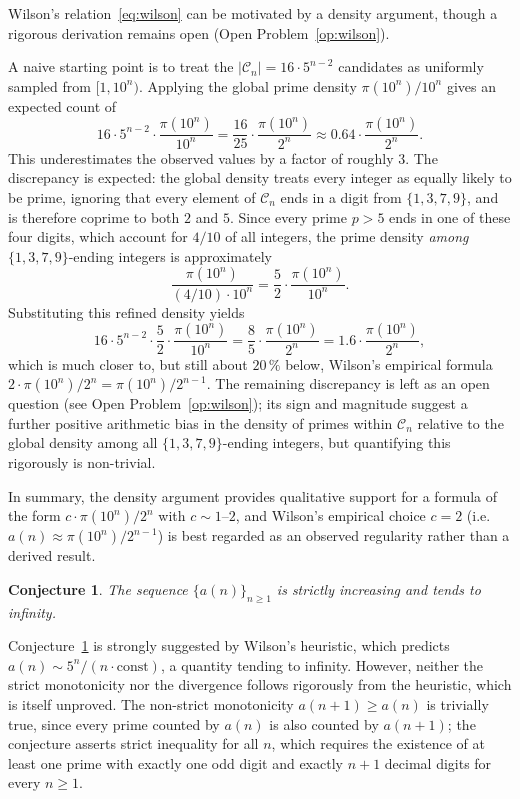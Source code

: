 \documentclass[11pt,a4paper]{article}
\newtheorem{conjecture}[theorem]{Conjecture}
\theoremstyle{definition}
\begin{document}
Wilson's relation~\eqref{eq:wilson} can be motivated by a density
argument, though a rigorous derivation remains open
(Open Problem~\ref{op:wilson}).

A naive starting point is to treat the $|\mathcal{C}_n| = 16 \cdot 5^{n-2}$
candidates as uniformly sampled from $[1, 10^n)$.  Applying the global
prime density $\pi(10^n)/10^n$ gives an expected count of
\[
  16 \cdot 5^{n-2} \cdot \frac{\pi(10^n)}{10^n}
   = \frac{16}{25} \cdot \frac{\pi(10^n)}{2^n}
   \approx 0.64 \cdot \frac{\pi(10^n)}{2^n}.
\]
This underestimates the observed values by a factor of roughly $3$.  The
discrepancy is expected: the global density treats every integer as equally
likely to be prime, ignoring that every element of $\mathcal{C}_n$
ends in a digit from $\{1,3,7,9\}$, and is therefore coprime to both $2$
and $5$.  Since every prime $p > 5$ ends in one of these four digits,
which account for $4/10$ of all integers, the prime density
\emph{among} $\{1,3,7,9\}$-ending integers is approximately
\[
  \frac{\pi(10^n)}{(4/10) \cdot 10^n}
  = \frac{5}{2} \cdot \frac{\pi(10^n)}{10^n}.
\]
Substituting this refined density yields
\[
  16 \cdot 5^{n-2} \cdot \frac{5}{2} \cdot \frac{\pi(10^n)}{10^n}
   = \frac{8}{5} \cdot \frac{\pi(10^n)}{2^n}
   = 1.6 \cdot \frac{\pi(10^n)}{2^n},
\]
which is much closer to, but still about $20\,\%$ below, Wilson's empirical
formula $2 \cdot \pi(10^n)/2^n = \pi(10^n)/2^{n-1}$. The remaining
discrepancy is left as an open question (see Open Problem~\ref{op:wilson});
its sign and magnitude suggest a further positive arithmetic bias in the
density of primes within $\mathcal{C}_n$ relative to the global density
among all $\{1,3,7,9\}$-ending integers, but quantifying this rigorously
is non-trivial.

In summary, the density argument provides qualitative support for a formula
of the form $c \cdot \pi(10^n)/2^n$ with $c \sim 1$--$2$, and Wilson's
empirical choice $c=2$ (i.e.\ $a(n) \approx \pi(10^n)/2^{n-1}$) is best
regarded as an observed regularity rather than a derived result.

\begin{conjecture}\label{conj:infinite}
The sequence $\{a(n)\}_{n\geq 1}$ is strictly increasing and tends to
infinity.
\end{conjecture}

Conjecture~\ref{conj:infinite} is strongly suggested by Wilson's
heuristic, which predicts $a(n) \sim 5^n/(n \cdot \text{const})$, a
quantity tending to infinity. However, neither the strict monotonicity nor
the divergence follows rigorously from the heuristic, which is itself
unproved. The non-strict monotonicity $a(n+1) \ge a(n)$ is trivially true,
since every prime counted by $a(n)$ is also counted by $a(n+1)$; the
conjecture asserts strict inequality for all $n$, which requires the
existence of at least one prime with exactly one odd digit and exactly
$n+1$ decimal digits for every $n \ge 1$.
\end{document}

